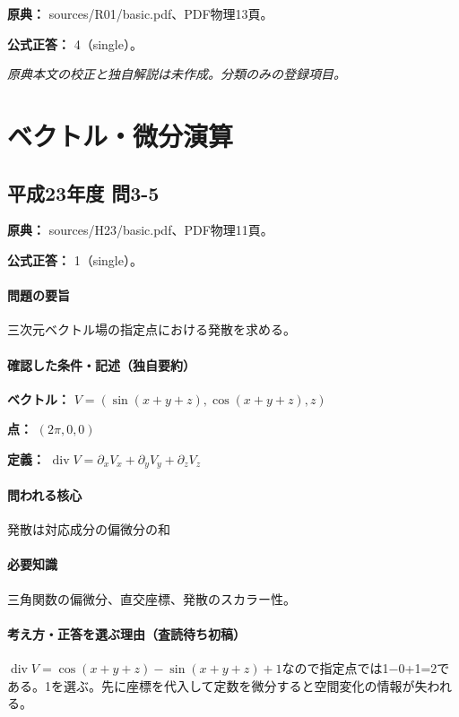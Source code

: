 \noindent\textbf{原典：} sources/R01/basic.pdf、PDF物理13頁。

\textbf{公式正答：} 4（single）。

\par\textit{原典本文の校正と独自解説は未作成。分類のみの登録項目。}

\section{ベクトル・微分演算}

\subsection{平成23年度 問3-5}
\label{q:h23-reg-basic-3-5}

\noindent\textbf{原典：} sources/H23/basic.pdf、PDF物理11頁。

\textbf{公式正答：} 1（single）。

\paragraph{問題の要旨} 三次元ベクトル場の指定点における発散を求める。

\paragraph{確認した条件・記述（独自要約）}\mbox{}\par

\noindent\textbf{ベクトル：} \(V=(\sin(x+y+z),\cos(x+y+z),z)\)\par

\noindent\textbf{点：} \((2\pi,0,0)\)\par

\noindent\textbf{定義：} \(\operatorname{div}V=\partial_xV_x+\partial_yV_y+\partial_zV_z\)\par

\paragraph{問われる核心} 発散は対応成分の偏微分の和

\paragraph{必要知識} 三角関数の偏微分、直交座標、発散のスカラー性。

\paragraph{考え方・正答を選ぶ理由（査読待ち初稿）} \(\operatorname{div}V=\cos(x+y+z)-\sin(x+y+z)+1\)なので指定点では1−0+1=\allowbreak{}2である。1を選ぶ。先に座標を代入して定数を微分すると空間変化の情報が失われる。

